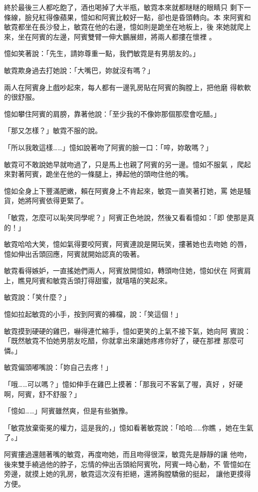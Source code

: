 終於最後三人都吃飽了，酒也喝掉了大半瓶，敏霓本來就都瞇瞇的眼睛只
剩下一條線，臉兒紅得像蘋果，憶如和阿賓比較好一點，卻也是昏頭轉向。本
來阿賓和敏霓都坐在長沙發上，敏霓在他的右邊，憶如則是跪坐在地板上，後
來她就爬上來，坐在阿賓的左邊，阿賓雙臂一伸大鵬展翅，將兩人都摟在懷裡
。

憶如笑著說：「先生，請妳尊重一點，我們敏霓是有男朋友的。」

敏霓欺身過去打她說：「大嘴巴，妳就沒有嗎？」

兩人在阿賓身上戲吵起來，每人都有一邊乳房貼在阿賓的胸膛上，把他磨
得軟軟的很舒服。

憶如攀住阿賓的肩膀，靠著他說：「至少我的不像妳那個那麼會吃醋。」

「那又怎樣？」敏霓不服的說。

「所以我敢這樣……」憶如說著吻了阿賓的臉一口：「啐，妳敢嗎？」

敏霓可不敢說她早就吻過了，只是馬上也親了阿賓的另一邊。憶如不服氣
，爬起來對著阿賓，跪坐在他的一條腿上，捧起他的頭吻住他的嘴。

憶如全身上下豐滿肥嫩，賴在阿賓身上不肯起來，敏霓一直笑著打她，罵
她是騷貨，她將阿賓依得更緊了。

「敏霓，怎麼可以恥笑同學呢？」阿賓正色地說，然後又看看憶如：「即
使那是真的！」

敏霓哈哈大笑，憶如氣得要咬阿賓，阿賓連說是開玩笑，摟著她也去吻她
的唇，憶如伸出舌頭回應，阿賓就開始認真的吸著。

敏霓看得嫉妒，一直搖她們兩人，阿賓放開憶如，轉頭吻住她，憶如伏在
阿賓肩上，瞧見阿賓和敏霓舌頭打得甜蜜，就嘻嘻的笑起來。

敏霓說：「笑什麼？」

憶如拉起敏霓的小手，按到阿賓的褲檔，說：「笑這個！」

敏霓摸到硬硬的雞巴，嚇得連忙縮手，憶如更笑的上氣不接下氣，她向阿
賓說：「既然敏霓不怕她男朋友吃醋，你就拿出來讓她疼疼你好了，硬在那裡
那麼可憐。」

敏霓偏頭嘟嘴說：「妳自己去疼！」

「哦……可以嗎？」憶如伸手在雞巴上摸著：「那我可不客氣了喔，真好
，好硬啊，阿賓，舒不舒服？」

「憶如……」阿賓雖然爽，但是有些猶豫。

「敏霓放棄衛冕的權力，這是我的，」憶如看著敏霓說：「哈哈……你瞧
，她在生氣了。」

阿賓摟過還翹著嘴的敏霓，再度吻她，而且吻得很深，敏霓先是靜靜的讓
他吻，後來雙手繞過他的脖子，忘情的伸出舌頭給阿賓吮，阿賓一時心動，不
管憶如在旁邊，就摸上她的乳房，敏霓這次沒有拒絕，還將胸膛驕傲的挺起，
讓他更摸得方便。

